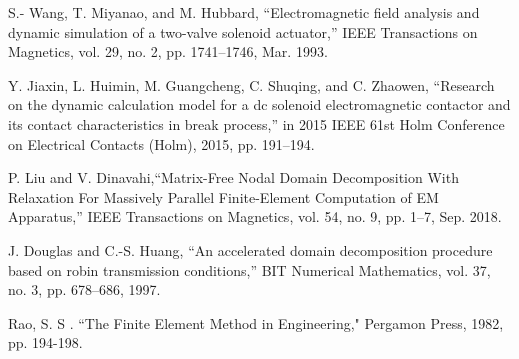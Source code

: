 \documentclass[journal,transmag]{IEEEtran}
\begin{document}
\begin{thebibliography}{1}
S.- Wang, T. Miyanao, and M. Hubbard, “Electromagnetic field analysis and dynamic simulation of a two-valve solenoid actuator,” IEEE Transactions on Magnetics, vol. 29, no. 2, pp. 1741–1746, Mar. 1993.

Y. Jiaxin, L. Huimin, M. Guangcheng, C. Shuqing, and C. Zhaowen, “Research on the dynamic calculation model for a dc solenoid electromagnetic contactor and its contact characteristics in break process,” in 2015 IEEE 61st Holm Conference on Electrical Contacts (Holm), 2015, pp. 191–194.
	

P. Liu and V. Dinavahi,``Matrix-Free Nodal Domain Decomposition With Relaxation For Massively Parallel Finite-Element Computation of EM Apparatus,” IEEE Transactions on Magnetics, vol. 54, no. 9, pp. 1–7, Sep. 2018.

J. Douglas and C.-S. Huang, “An accelerated domain decomposition procedure based on robin transmission conditions,” BIT Numerical Mathematics, vol. 37, no. 3, pp. 678–686, 1997.

Rao, S. S . ``The Finite Element Method in Engineering," Pergamon Press, 1982, pp. 194-198.

\end{thebibliography}
\end{document}
